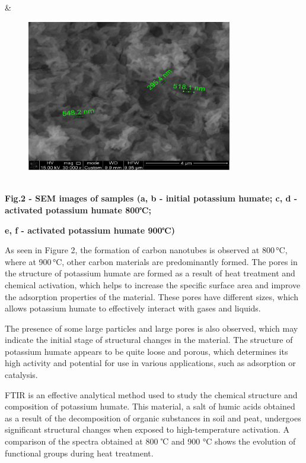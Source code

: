  &
\begin{figure}[H]
	\centering
	\includegraphics[width=0.8\textwidth]{media/chem2/image98.tiff}
	\caption*{}
\end{figure}
 \\

{\bfseries Fig.2 - SEM images of samples (a, b - initial potassium humate;
c, d - activated potassium humate 800℃;}

{\bfseries e, f - activated potassium humate 900℃)}

As seen in Figure 2, the formation of carbon nanotubes is observed at
800\,°C, where at 900\,°C, other carbon materials are predominantly
formed. The pores in the structure of potassium humate are formed as a
result of heat treatment and chemical activation, which helps to
increase the specific surface area and improve the adsorption properties
of the material. These pores have different sizes, which allows
potassium humate to effectively interact with gases and liquids.

The presence of some large particles and large pores is also observed,
which may indicate the initial stage of structural changes in the
material. The structure of potassium humate appears to be quite loose
and porous, which determines its high activity and potential for use in
various applications, such as adsorption or catalysis.

FTIR is an effective analytical method used to study the chemical
structure and composition of potassium humate. This material, a salt of
humic acids obtained as a result of the decomposition of organic
substances in soil and peat, undergoes significant structural changes
when exposed to high-temperature activation. A comparison of the spectra
obtained at 800 ℃ and 900 °C shows the evolution of functional groups
during heat treatment.

